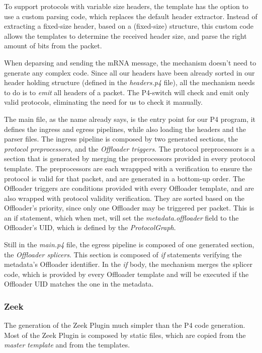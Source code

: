 To support protocols with variable size headers, the template has the option to use a custom parsing code, which replaces the default header extractor. Instead of extracting a fixed-size header, based on a (fixed-size) structure, this custom code allows the templates to determine the received header size, and parse the right amount of bits from the packet.

When deparsing and sending the mRNA message, the mechanism doesn't need to generate any complex code. Since all our headers have been already sorted in our header holding structure (defined in the \textit{headers.p4} file), all the mechanism needs to do is to \textit{emit} all headers of a packet. The P4-switch will check and emit only valid protocols, eliminating the need for us to check it manually.

The main file, as the name already says, is the entry point for our P4 program, it defines the ingress and egress pipelines, while also loading the headers and the parser files. The ingress pipeline is composed by two generated sections, the \textit{protocol preprocessors}, and the \textit{Offloader triggers}. The protocol preprocessors is a section that is generated by merging the preprocessors provided in every protocol template. The preprocessors are each wrappped with a verification to ensure the protocol is valid for that packet, and are generated in a bottom-up order. The Offloader triggers are conditions provided with every Offloader template, and are also wrapped with protocol validity verification. They are sorted based on the Offloader's priority, since only one Offloader may be triggered per packet. This is an if statement, which when met, will set the \textit{metadata.offloader} field to the Offloader's UID, which is defined by the \textit{ProtocolGraph}.

Still in the \textit{main.p4} file, the egress pipeline is composed of one generated section, the \textit{Offloader splicers}. This section is composed of \textit{if} statements verifying the metadata's Offloader identifier. In the \textit{if} body, the mechanism merges the splicer code, which is provided by every Offloader template and will be executed if the Offloader UID matches the one in the metadata.

\subsubsection*{Zeek}

The generation of the Zeek Plugin much simpler than the P4 code generation. Most of the Zeek Plugin is composed by static files, which are copied from the \textit{master template} and from the templates. 

